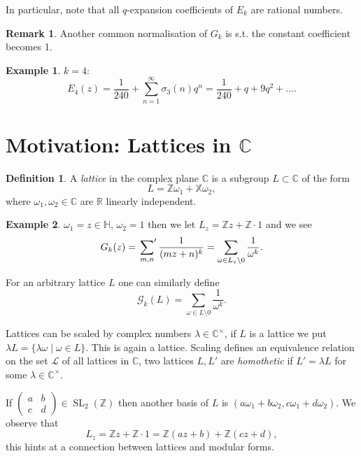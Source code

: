 \documentclass{article}
\theoremstyle{definition}
\newtheorem*{defn}{Definition}
\newtheorem*{ex}{Example}
\newtheorem*{rem}{Remark}
\DeclareMathOperator{\SL}{SL}
\begin{document}
In particular, note that all $q$-expansion coefficients of $E_k$ are rational numbers.

\begin{rem}
Another common normalisation of $G_k$ is s.t. the constant coefficient becomes 1.
\end{rem}

\begin{ex}
$k=4$:
\[E_4(z) = \frac{1}{240} + \sum_{n=1}^{\infty} \sigma_3(n)q^n = \frac{1}{240} + q + 9q^2 + \ldots.\]
\end{ex}

\section{Motivation: Lattices in $\mathbb{C}$}

\begin{defn}
A \emph{lattice} in the complex plane $\mathbb{C}$ is a subgroup $L\subset \mathbb{C}$ of the form
\[L = \mathbb{Z}\omega_1 + \mathbb{X}\omega_2,\]
where $\omega_1,\omega_2\in\mathbb{C}$ are $\mathbb{R}$ linearly independent.
\end{defn}

\begin{ex}
$\omega_1=z\in\mathbb{H}$, $\omega_2=1$ then we let $L_z = \mathbb{Z}z + \mathbb{Z}\cdot 1$ and we see
\[G_k(z) = \sideset{}{'}\sum_{m,n}\frac{1}{(mz+n)^k} = \sum_{\omega\in L_z\setminus 0} \frac{1}{\omega^k}.\]

For an arbitrary lattice $L$ one can similarly define
\[\mathscr{G}_k(L) = \sum_{\omega\in L\setminus0} \frac{1}{\omega^k}.\]
\end{ex}

Lattices can be scaled by complex numbers $\lambda\in\mathbb{C}^\times$, if $L$ is a lattice we put $\lambda L = \{\lambda\omega\mid \omega\in L\}$.
This is again a lattice.
Scaling defines an equivalence relation on the set $\mathcal{L}$ of all lattices in $\mathbb{C}$, two lattices $L,L'$ are \emph{homothetic} if $L'=  \lambda L$ for some $\lambda\in\mathbb{C}^\times$.



If $\begin{pmatrix}
a&b\\c&d
\end{pmatrix}\in\SL_2(\mathbb{Z})$ then another basis  of $L$ is $(a\omega_1 + b\omega_2, c\omega_1 + d\omega_2)$.
We observe that
\[L_z = \mathbb{Z}z + \mathbb{Z}\cdot 1 = \mathbb{Z}(az+b) + \mathbb{Z}(cz+d),\]
this hints at a connection between lattices and modular forms.
\end{document}
